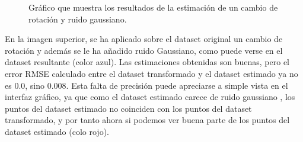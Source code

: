 \begin{figure}[H]
\begin{center}
\hspace{0.5cm}

\end{center}

\caption{Gráfico que muestra los resultados de la estimación de un cambio de rotación y ruido gaussiano.}
\end{figure}
En la imagen superior, se ha aplicado sobre el dataset original un cambio de rotación y además se le ha añadido ruido Gaussiano, como puede verse en el dataset resultante (color azul). Las estimaciones obtenidas son buenas, pero el error RMSE calculado entre el dataset transformado y el dataset estimado ya no es 0.0, sino 0.008. Esta falta de precisión puede apreciarse a simple vista en el interfaz gráfico, ya que como el dataset estimado carece de ruido gaussiano , los puntos del dataset estimado no coinciden con los puntos del dataset transformado, y por tanto ahora si podemos ver buena parte de los puntos del dataset estimado (colo rojo).




